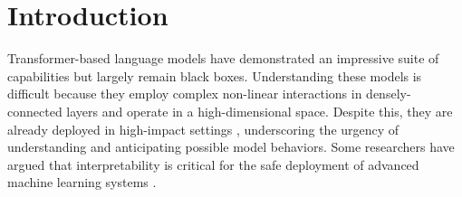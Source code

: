 





\section{Introduction}
\label{sec:intro}



 Transformer-based language models \citep{Attention,GPT3} have demonstrated an impressive suite of capabilities but largely remain black boxes. Understanding these models is difficult because they employ complex non-linear interactions in densely-connected layers and operate in a high-dimensional space. Despite this, they are already deployed in high-impact settings \citep{zhang2022shifting, caldarini2022literature},  underscoring the urgency of understanding and anticipating possible model behaviors. Some researchers have argued that interpretability is critical for the safe deployment of advanced machine learning systems \citep{Hendrycks2022XRiskAF}.

